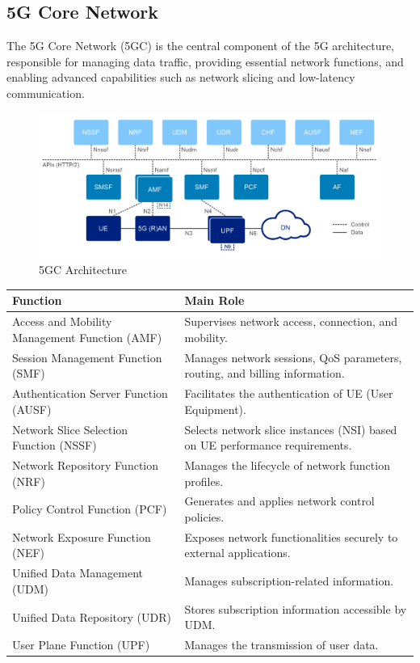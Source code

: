 \documentclass{report}
\begin{document}
\subsection{5G Core Network}
The 5G Core Network (5GC) is the central component of the 5G architecture, responsible for managing data traffic, providing essential network functions, and enabling advanced capabilities such as network slicing and low-latency communication.
\begin{figure}[H]
    \centering
    \includegraphics[width=0.8\linewidth]{figures/5GC.png}
    \caption{5GC Architecture \cite{dolente2023vulnerability}}
    \label{fig:enter-label}
\end{figure}

\begin{table}[H]
    \centering
    \begin{tabularx}{\textwidth}{lX}
        \toprule
        \textbf{Function} & \textbf{Main Role} \\
        \midrule
        Access and Mobility Management Function (AMF) & Supervises network access, connection, and mobility. \\
        \addlinespace
        Session Management Function (SMF) & Manages network sessions, QoS parameters, routing, and billing information. \\
        \addlinespace
        Authentication Server Function (AUSF) & Facilitates the authentication of UE (User Equipment). \\
        \addlinespace
        Network Slice Selection Function (NSSF) & Selects network slice instances (NSI) based on UE performance requirements. \\
        \addlinespace
        Network Repository Function (NRF) & Manages the lifecycle of network function profiles. \\
        \addlinespace
        Policy Control Function (PCF) & Generates and applies network control policies. \\
        \addlinespace
        Network Exposure Function (NEF) & Exposes network functionalities securely to external applications. \\
        \addlinespace
        Unified Data Management (UDM) & Manages subscription-related information. \\
        \addlinespace
        Unified Data Repository (UDR) & Stores subscription information accessible by UDM. \\
        \addlinespace
        User Plane Function (UPF) & Manages the transmission of user data. \\
        \bottomrule
    \end{tabularx}
\end{table}
\end{document}
